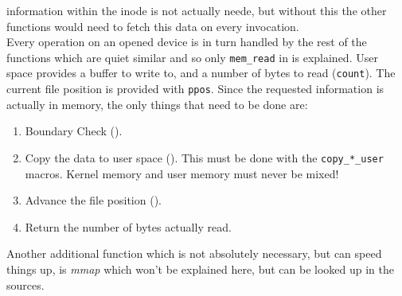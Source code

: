 \documentclass[11pt,technote,a4paper,onecolumn,dvips]{IEEEtran}
\begin{document}
information within the inode is not actually neede, but without this the
other functions would need to fetch this data on every invocation.\\
Every operation on an opened device is in turn handled by the rest of the
functions which are quiet similar and so only \lstinline+mem_read+ in
 is explained. User space provides a buffer to write to,
and a number of bytes to read (\lstinline+count+). The current file
position is provided with \lstinline+ppos+. Since the requested information
is actually in memory, the only things that need to be done are:
\begin{enumerate}
    \item Boundary Check ().
    \item Copy the data to user space (). This must be
        done with the \lstinline+copy_*_user+ macros. Kernel memory and
        user memory must never be mixed!
    \item Advance the file position ().
    \item Return the number of bytes actually read.
\end{enumerate}
Another additional function which is not absolutely necessary, but can speed
things up, is \emph{mmap} which won't be explained here, but can be looked up
in the sources.
\end{document}
